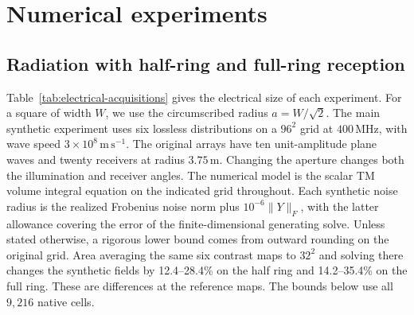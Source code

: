\section{Numerical experiments}\label{sec:exp}

\subsection{Radiation with half-ring and full-ring reception}\label{sec:exp-radiation}

Table~\ref{tab:electrical-acquisitions} gives the electrical size of each experiment. For a square of width \(W\), we use the circumscribed radius \(a=W/\sqrt{2}\). The main synthetic experiment uses six lossless distributions on a \(96^2\) grid at \(400\,\mathrm{MHz}\), with wave speed \(3\times10^8\,\mathrm{m\,s^{-1}}\). The original arrays have ten unit-amplitude plane waves and twenty receivers at radius \(3.75\,\mathrm{m}\). Changing the aperture changes both the illumination and receiver angles. The numerical model is the scalar TM volume integral equation on the indicated grid throughout. Each synthetic noise radius is the realized Frobenius noise norm plus \(10^{-6}\|Y\|_F\), with the latter allowance covering the error of the finite-dimensional generating solve. Unless stated otherwise, a rigorous lower bound comes from outward rounding on the original grid. Area averaging the same six contrast maps to \(32^2\) and solving there changes the synthetic fields by 12.4--28.4\% on the half ring and 14.2--35.4\% on the full ring. These are differences at the reference maps. The bounds below use all \(9{,}216\) native cells.

